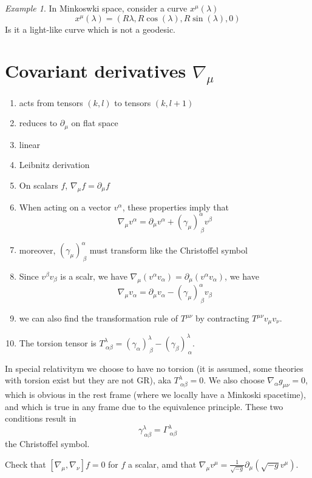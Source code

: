 \documentclass[a4paper]{book}
\theoremstyle{definition}
\theoremstyle{remark}
\newtheorem*{example}{Example}
\begin{document}
\begin{example}
    In Minkoswki space, consider a curve $x^\mu(\lambda)$
    \begin{equation}
        x^\mu(\lambda) = (R\lambda, R\cos(\lambda), R\sin(\lambda), 0)
    \end{equation}
    Is it a light-like curve which is not a geodesic.
\end{example}

\section{Covariant derivatives $\nabla_\mu$}

\begin{enumerate}
    \item acts from tensors $(k,l)$ to tensors $(k, l+1)$
    \item reduces to $\partial_\mu$ on flat space
    \item linear 
    \item Leibnitz derivation 
    \item On scalars $f$, $\nabla_\mu f = \partial_\mu f$
    \item When acting on a vector $v^\alpha$, these properties imply that 
        \begin{equation}
        \nabla_\mu v^\alpha = \partial_\mu v^\alpha + (\gamma_\mu)^\alpha_{~\beta} v^\beta
        \end{equation}
    \item moreover, $(\gamma_\mu)^\alpha_{~\beta}$ must transform like the Christoffel symbol 
    \item Since $v^\beta v_\beta$ is a scalr, we have $\nabla_\mu (v^\alpha v_\alpha) = \partial_\mu (v^\alpha v_\alpha)$, we have 
    \begin{equation}
        \nabla_\mu v_\alpha = \partial_\mu v_\alpha - (\gamma_\mu)^\alpha_{~\beta} v_\beta
    \end{equation}
    \item we can also find the transformation rule of $T^{\mu\nu}$ by contracting $T^{\mu\nu}v_{\mu}v_\nu$. 
    \item The torsion tensor is $T^\lambda_{~\alpha\beta} = (\gamma_\alpha)^\lambda_{~\beta} - (\gamma_\beta)^\lambda_{~\alpha}$.
\end{enumerate}

In special relativitym we choose to have no torsion (it is assumed, some theories with torsion exist but they are not GR), aka $T^\lambda_{~\alpha\beta} = 0$. We also choose $\nabla_\alpha g_{\mu\nu} = 0$, which is obvious in the rest frame (where we locally have a Minkoski spacetime), and which is true in any frame due to the equivalence principle. These two conditions result in 
\begin{equation}
    \gamma^\lambda_{~\alpha\beta} = \Gamma^\lambda_{~\alpha\beta}
\end{equation}
the Christoffel symbol. \par \bigskip 
Check that $[\nabla_\mu, \nabla_\nu]f = 0$ for $f$ a scalar, amd that $\nabla_\mu v^\mu = \frac{1}{\sqrt{-g}}\partial_\mu (\sqrt{-g}v^\mu)$. \par \bigskip 
\end{document}
